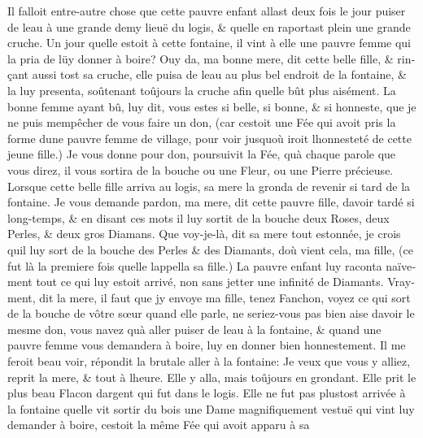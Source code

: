 \documentclass[14pt,a4paper]{memoir}
\begin{document}
\begin{otherlanguage}{french}
Il falloit entre-autre chose que cette pauvre enfant allast deux fois le
jour puiser de l\textquotesingle eau à une grande demy lieuë du logis,
\& qu\textquotesingle elle en raportast plein une grande cruche. Un jour
qu\textquotesingle elle estoit à cette fontaine, il vint à elle une
pauvre femme qui la pria de lüy donner à boire? Ouy da, ma bonne mere,
dit cette belle fille, \& rinçant aussi tost sa cruche, elle puisa de
l\textquotesingle eau au plus bel endroit de la fontaine, \& la luy
presenta, soûtenant toûjours la cruche afin qu\textquotesingle elle bût
plus aisément. La bonne femme ayant bû, luy dit, vous estes si belle, si
bonne, \& si honneste, que je ne puis m\textquotesingle empêcher de vous
faire un don, (car c\textquotesingle estoit une Fée qui avoit pris la
forme d\textquotesingle une pauvre femme de village, pour voir
jusqu\textquotesingle où iroit l\textquotesingle honnesteté de cette
jeune fille.) Je vous donne pour don, poursuivit la Fée,
qu\textquotesingle à chaque parole que vous direz, il vous sortira de la
bouche ou une Fleur, ou une Pierre précieuse. Lorsque cette belle fille
arriva au logis, sa mere la gronda de revenir si tard de la fontaine. Je
vous demande pardon, ma mere, dit cette pauvre fille,
d\textquotesingle avoir tardé si long-temps, \& en disant ces mots il
luy sortit de la bouche deux Roses, deux Perles, \& deux gros Diamans.
Que voy-je-là, dit sa mere tout estonnée, je crois qu\textquotesingle il
luy sort de la bouche des Perles \& des Diamants, d\textquotesingle où
vient cela, ma fille, (ce fut là la premiere fois
qu\textquotesingle elle l\textquotesingle appella sa fille.) La pauvre
enfant luy raconta naïvement tout ce qui luy estoit arrivé, non sans
jetter une infinité de Diamants. Vrayment, dit la mere, il faut que
j\textquotesingle y envoye ma fille, tenez Fanchon, voyez ce qui sort de
la bouche de vôtre sœur quand elle parle, ne seriez-vous pas bien aise
d\textquotesingle avoir le mesme don, vous n\textquotesingle avez
qu\textquotesingle à aller puiser de l\textquotesingle eau à la
fontaine, \& quand une pauvre femme vous demandera à boire, luy en
donner bien honnestement. Il me feroit beau voir, répondit la brutale
aller à la fontaine: Je veux que vous y alliez, reprit la mere, \& tout
à l\textquotesingle heure. Elle y alla, mais toûjours en grondant. Elle
prit le plus beau Flacon d\textquotesingle argent qui fut dans le logis.
Elle ne fut pas plustost arrivée à la fontaine qu\textquotesingle elle
vit sortir du bois une Dame magnifiquement vestuë qui vint luy demander
à boire, c\textquotesingle estoit la même Fée qui avoit apparu à sa

\end{otherlanguage}
\end{document}
